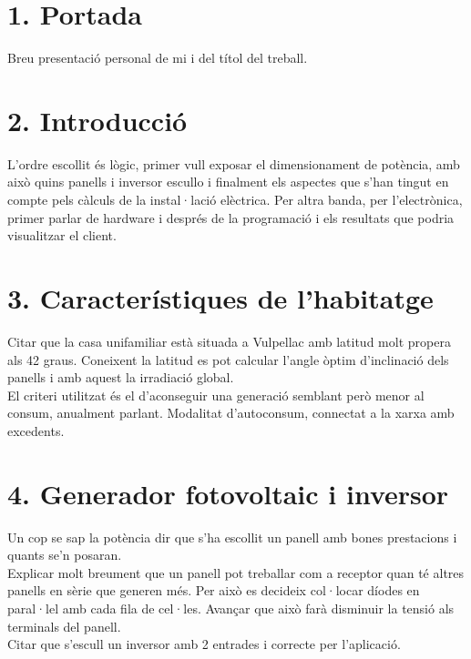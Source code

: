
\section*{1. Portada}
Breu presentació personal de mi i del títol del treball.

\section*{2. Introducció}
L'ordre escollit és lògic, primer vull exposar el dimensionament de potència, amb això quins panells i inversor escullo i finalment els aspectes que s'han tingut en compte pels càlculs de la instal·lació elèctrica. Per altra banda, per l'electrònica, primer parlar de hardware i després de la programació i els resultats que podria visualitzar el client.

\section*{3. Característiques de l'habitatge}
Citar que la casa unifamiliar està situada a Vulpellac amb latitud molt propera als 42 graus. Coneixent la latitud es pot calcular l'angle òptim d'inclinació dels panells i amb aquest la irradiació global.\\
\newline El criteri utilitzat és el d'aconseguir una generació semblant però menor al consum, anualment parlant. Modalitat d'autoconsum, connectat a la xarxa amb excedents.

\section*{4. Generador fotovoltaic i inversor}
Un cop se sap la potència dir que s'ha escollit un panell amb bones prestacions i quants se'n posaran.\\
\newline Explicar molt breument que un panell pot treballar com a receptor quan té altres panells en sèrie que generen més. Per això es decideix col·locar díodes en paral·lel amb cada fila de cel·les. Avançar que això farà disminuir la tensió als terminals del panell.\\
\newline Citar que s'escull un inversor amb 2 entrades i correcte per l'aplicació.

